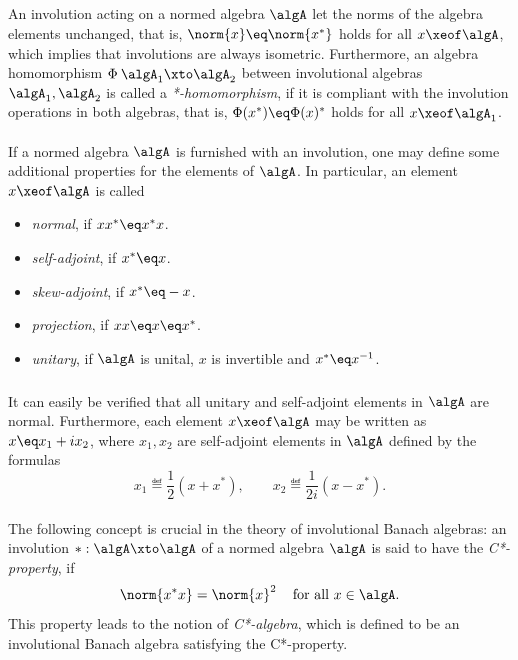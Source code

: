 \documentclass[11pt,twoside]{article}
\begin{document}
\subparagraph{} %
An involution acting on a normed algebra $\algA$
let the norms of the algebra elements unchanged,
that is,
$\norm{x} \eq \norm{x^*}$ holds for all $x \xeof \algA$,
which implies that involutions are always isometric.
Furthermore,
an algebra homomorphism $\Phi \:\algA_1 \xto \algA_2$
between involutional algebras $\algA_1, \algA_2$
is called a \textit{*-homomorphism},
if it is compliant with the involution operations in both algebras,
that is,
$\Phi(x^*) \eq \Phi(x)^*$ holds for all $x \xeof \algA_1$.

\paragraph{}
If a normed algebra $\algA$ is furnished with an involution,
one may define some additional properties for the elements of $\algA$.
In particular,
an element $x \xeof \algA$ is called

\begin{itemize}[leftmargin=30pt]
\item[1.] \textit{normal},       if $x x^* \eq x^* x$.
\item[2.] \textit{self-adjoint}, if $x^* \eq x$.
\item[3.] \textit{skew-adjoint}, if $x^* \eq -x$.
\item[4.] \textit{projection},   if $x x \eq x \eq x^*$.
\item[5.] \textit{unitary},      if $\algA$ is unital,
                                    $x$ is invertible and $x^* \eq x^{-1}$.
\end{itemize}

\subparagraph{}
It can easily be verified
that
all unitary and self-adjoint elements in $\algA$ are normal.
Furthermore,
each element $x \xeof \algA$ may be written as $x \eq x_1 + i x_2$,
where $x_1, x_2$ are self-adjoint elements in $\algA$ defined by the formulas
\[
x_1 \eqdef \frac{1}{2}(x+x^*),
\quad \quad
x_2 \eqdef \frac{1}{2i}(x-x^*).
\]

\paragraph{} %
The following concept is crucial in the theory of involutional Banach algebras:
an involution $*:\algA \xto \algA$ of a normed algebra $\algA$ 
is said to have the \textit{C*-property},
if
\[
\norm{x^* x} = \norm{x}^2
\quad \, \mbox{for all }
x \in \algA.
\]
This property leads to the notion of \textit{C*-algebra},
which is defined to be an
{involutional Banach algebra satisfying the C*-property}.
\end{document}
